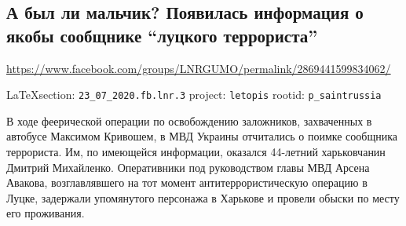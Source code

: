  
 
\subsection{А был ли мальчик? Появилась информация о якобы сообщнике ``луцкого террориста''}
\url{https://www.facebook.com/groups/LNRGUMO/permalink/2869441599834062/}

\vspace{0.5cm}
{\small\LaTeX section: \verb|23_07_2020.fb.lnr.3| project: \verb|letopis| rootid: \verb|p_saintrussia|}
\vspace{0.5cm}

В ходе феерической операции по освобождению заложников, захваченных в автобусе
Максимом Кривошем, в МВД Украины отчитались о поимке сообщника террориста. Им,
по имеющейся информации, оказался 44-летний харьковчанин Дмитрий Михайленко.
Оперативники под руководством главы МВД Арсена Авакова, возглавлявшего на тот
момент антитеррористическую операцию в Луцке, задержали упомянутого персонажа в
Харькове и провели обыски по месту его проживания. 
